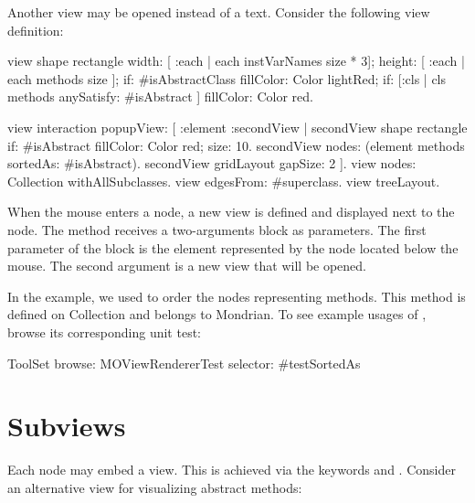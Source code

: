 \documentclass[a4paper,10pt,twoside]{book}
\begin{document}

Another view may be opened instead of a text. Consider the following view definition:

\begin{code}{}
view shape rectangle
  width: [ :each | each instVarNames size * 3];
  height: [ :each | each methods size ];
  if: #isAbstractClass fillColor: Color lightRed;
  if: [:cls | cls methods anySatisfy: #isAbstract ] fillColor: Color red.
  
view interaction popupView: [ :element :secondView | 
  secondView shape rectangle 
    if: #isAbstract fillColor: Color red;
    size: 10.  
  secondView nodes: (element methods sortedAs: #isAbstract).
  secondView gridLayout gapSize: 2
  ].
view nodes: Collection withAllSubclasses.
view edgesFrom: #superclass.
view treeLayout.
\end{code}

When the mouse enters a node, a new view is defined and displayed next to the node. The method  receives a two-arguments block as parameters. The first parameter of the block is the element represented by the node located below the mouse. The second argument is a new view that will be opened.

In the example, we used  to order the nodes representing methods. This method is defined on Collection and belongs to Mondrian. To see example usages of , browse its corresponding unit test:
\begin{code}{}
ToolSet browse: MOViewRendererTest selector: #testSortedAs 
\end{code}

\section{Subviews}
Each node may embed a view. This is achieved via the keywords  and . Consider an alternative view for visualizing abstract methods:
\end{document}
